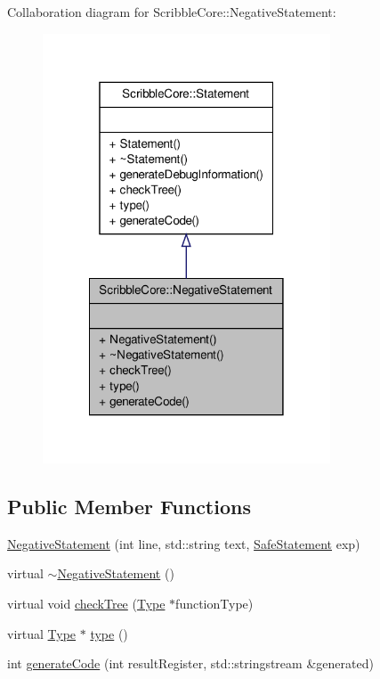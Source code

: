 Collaboration diagram for Scribble\-Core\-:\-:Negative\-Statement\-:
\nopagebreak
\begin{figure}[H]
\begin{center}
\leavevmode
\includegraphics[width=242pt]{class_scribble_core_1_1_negative_statement__coll__graph}
\end{center}
\end{figure}
\subsection*{Public Member Functions}
\begin{DoxyCompactItemize}
\item 
\hyperlink{class_scribble_core_1_1_negative_statement_a07de206671ad926d91608e01bda11e0a}{Negative\-Statement} (int line, std\-::string text, \hyperlink{namespace_scribble_core_a2ad5bf236bc9164cb56f564685f15a11}{Safe\-Statement} exp)
\item 
virtual \hyperlink{class_scribble_core_1_1_negative_statement_a3f1bf54101756213cc23a942ea80f17d}{$\sim$\-Negative\-Statement} ()
\item 
virtual void \hyperlink{class_scribble_core_1_1_negative_statement_aa81869d3f1a8e5b7cd76e5d6cd66c101}{check\-Tree} (\hyperlink{class_scribble_core_1_1_type}{Type} $\ast$function\-Type)
\item 
virtual \hyperlink{class_scribble_core_1_1_type}{Type} $\ast$ \hyperlink{class_scribble_core_1_1_negative_statement_af7365582aa7f33fd0324f59d1123abc6}{type} ()
\item 
int \hyperlink{class_scribble_core_1_1_negative_statement_a69ba602bd56f3eb96c0842e082e0ce73}{generate\-Code} (int result\-Register, std\-::stringstream \&generated)
\end{DoxyCompactItemize}


